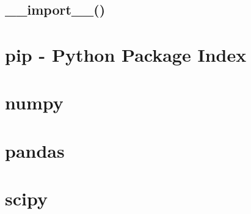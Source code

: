 \documentclass{article}
\begin{document}
\subsection{\_\_import\_\_()}
%

\section{pip - Python Package Index}


\section{numpy}

\section{pandas}

\section{scipy}

\newpage



\end{document}
